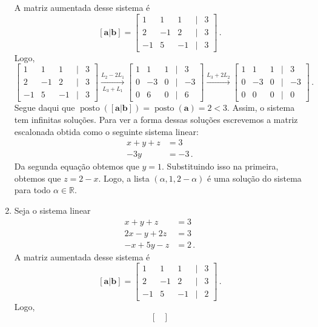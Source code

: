 \documentclass[12pt,a4paper]{report}
\newcommand{\mb}{\mathbf}
\newcommand{\R}{\mathbb{R}}
\DeclareMathOperator{\posto}{posto}
\begin{document}
\begin{enumerate}
\begin{equation*}
  \end{equation*}
  A matriz aumentada desse sistema é
  $$[\mb a|\mb b]=\begin{bmatrix}
    1&1&1&|&3\\
    2&-1&2&|&3\\
    -1&5&-1&|&3
  \end{bmatrix}\,.$$
  Logo,
  $$\begin{bmatrix}
    1&1&1&|&3\\
    2&-1&2&|&3\\
    -1&5&-1&|&3
  \end{bmatrix}\xrightarrow[L_3+L_1]{L_2-2L_1} \begin{bmatrix}
    1&1&1&|&3\\
    0&-3&0&|&-3\\
    0&6&0&|&6
  \end{bmatrix}\xrightarrow{L_3+2L_2} \begin{bmatrix}
    1&1&1&|&3\\
    0&-3&0&|&-3\\
    0&0&0&|&0
  \end{bmatrix}\,.$$
  Segue daqui que $\posto([\mb a|\mb b])=\posto(\mb a)=2<3$. Assim, o sistema tem infinitas soluções. Para ver a forma dessas soluções escrevemos a matriz escalonada obtida como o seguinte sistema linear:
  \begin{equation*}
    \begin{split}
      x+y+z&=3\\
      -3y&=-3\,.
    \end{split}
  \end{equation*}
  Da segunda equação obtemos que $y=1$. Substituindo isso na primeira, obtemos que $z=2-x$. Logo, a lista $(\alpha,1,2-\alpha)$ é uma solução do sistema para todo $\alpha\in\R$.
  \item Seja o sistema linear
  \begin{equation*}
    \begin{split}
      x+y+z&=3\\
      2x-y+2z&=3\\
      -x+5y-z&=2\,.
    \end{split}
  \end{equation*}
  A matriz aumentada desse sistema é
  $$[\mb a|\mb b]=\begin{bmatrix}
    1&1&1&|&3\\
    2&-1&2&|&3\\
    -1&5&-1&|&2
  \end{bmatrix}\,.$$
  Logo,
  $$\begin{bmatrix}

\end{bmatrix}$$
\end{enumerate}
\end{document}
